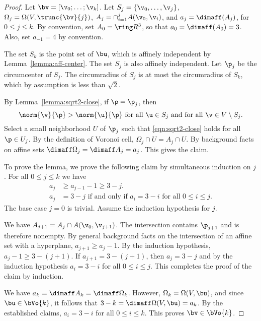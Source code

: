 \begin{cnl}
\begin{proof} 
Let $\bv = \listdots{\v}{0}{k}$.  
Let $S_j = \setenumdots{\v}{0}{j}$,  
$\Omega_j = \Omega(V,\trunc{\bv}{j})$, 
$A_j=\cap_{i=1}^j \AA{\v_0}{\v_i}$, and $a_j = \dimaff(A_j)$, for $0\le j\le k$.
By convention, set $A_0 = \vecR{3}$, so that $a_0=\dimaff(A_0) = 3$.
Also, set $a_{-1} = 4$ by convention.

The set $S_k$ is the point set of $\bu$, which is affinely independent
by Lemma~\ref{lemma:aff-center}.  The set $S_j$ is also affinely
independent.  Let $\p_j$ be the circumcenter of $S_j$.  The
circumradius of $S_j$ is at most the circumradius of $S_k$, which by
assumption is less than $\sqrt2$.

By Lemma~\ref{lemma:sqrt2-close}, if $\p=\p_j$, then
\begin{equation}\label{eqn:sqrt2-close} 
\norm{\v}{\p} > \norm{\u}{\p}\text{ for all }\u\in S_j
\text{ and for all }\v\in V\setminus S_j.
\end{equation}   
Select a small neighborhood $U$ of $\p_j$ such that \eqref{eqn:sqrt2-close} holds
for all $\p\in U_j$.  By the definition of Voronoi cell, $\Omega_j \cap U=A_j\cap U$.
By background facts on affine sets $\dimaff\Omega_j = \dimaff A_j=a_j$.  This gives
the claim.

To prove the lemma, we prove the following claim by simultaneous
induction on $j$.  For all $0\le j\le k$ we have
\begin{align*}
a_j &\ge a_{j-1} - 1\ge 3-j.\\
a_j &= 3-j \text{ if and only if } a_i=3-i \text{ for all } 0\le i\le j.
\end{align*}
The base case $j=0$ is trivial.  Assume the induction hypothesis for $j$.

We have $A_{j+1} = A_{j}\cap \AA{\v_0}{\v_{j+1}}$.  The intersection
contains $\p_{j+1}$ and is therefore nonempty.  By general background
facts on the intersection of an affine set with a hyperplane, $a_{j+1}
\ge a_{j}-1$.  By the induction hypothesis, $a_{j}-1\ge 3-(j+1)$.  If
$a_{j+1}=3-(j+1)$, then $a_{j}=3-j$ and by the induction hypothesis
$a_{i}=3-i$ for all $0\le i\le j$. This completes the proof of the
claim by induction.

We have $a_k = \dimaff A_k=\dimaff \Omega_k$.  However, $\Omega_k=
\Omega(V,\bu)$, and since $\bu\in \bVo{k}$, it follows that
$3-k=\dimaff\Omega(V,\bu)=a_k$.  By the established claims, $a_i = 3-i$
for all $0\le i\le k$.  This proves $\bv\in\bVo{k}$.


\end{proof}
\end{cnl}
